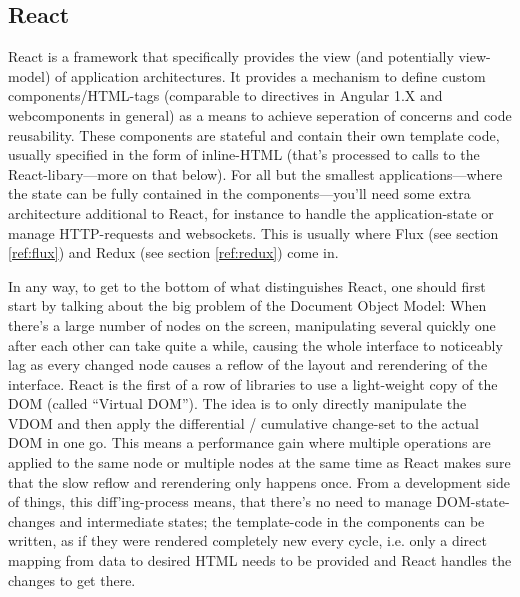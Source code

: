 %

\subsection{React}

React is a framework that specifically provides the view (and potentially view-model) of application architectures. It provides a mechanism to define custom components/HTML-tags (comparable to directives in Angular 1.X and webcomponents in general) as a means to achieve seperation of concerns and code reusability. These components are stateful and contain their own template code, usually specified in the form of inline-HTML (that's processed to calls to the React-libary---more on that
below). %
For all but the smallest applications---where the state can be fully contained in the components---you'll need some extra architecture additional to React, for instance to handle the application-state or manage HTTP-requests and websockets. This is usually where Flux (see section \ref{ref:flux}) and Redux (see section \ref{ref:redux}) come in.

In any way, to get to the bottom of what distinguishes React, one should first start by talking about the big problem of the Document Object Model: When there's a large number of nodes on the screen, manipulating several quickly one after each other can take quite a while, causing the whole interface to noticeably lag as every changed node causes a reflow of the layout and rerendering of the interface. React is the first of a row of libraries to use a light-weight copy of the DOM (called ``Virtual DOM''). The idea is to only directly manipulate the VDOM and then apply
the differential / cumulative change-set to the actual DOM in one go. This means a performance gain where multiple operations are applied to the same node or multiple nodes at the same time as React makes sure that the slow reflow and rerendering only happens once. From a development side of things, this diff'ing-process means, that there's no need to manage DOM-state-changes and intermediate states; the template-code in the components can be written, as if they were rendered completely new every cycle, i.e. only a direct
mapping from data to desired HTML needs to be provided and React handles the changes to get there.

